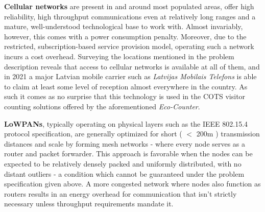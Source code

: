 \documentclass[10pt,nocopyrightspace]{ewsn-proc}
\begin{document}
\textbf{Cellular networks} are present in and around most populated areas, offer high reliability, high throughput communications even at relatively long ranges and a mature, well-understood technological base to work with. Almost invariably, however, this comes with a power consumption penalty. Moreover, due to the restricted, subscription-based service provision model, operating such a network incurs a cost overhead. Surveying the locations mentioned in the problem description reveals that access to cellular networks is available at all of them, and in 2021 a major Latvian mobile carrier such as \textit{Latvijas Mobilais Telefons} is able to claim at least  some level of reception almost everywhere in the country. As such it comes as no surprise that this technology is used in the COTS visitor counting solutions offered by the aforementioned \textit{Eco-Counter}.

\textbf{LoWPANs}, typically operating on physical layers such as the IEEE 802.15.4 protocol specification, are generally optimized for short ( $<$ 200m ) transmission distances and scale by forming mesh networks - where every node serves as a router and packet forwarder. This approach is favorable when the nodes can be expected to be relatively densely packed and uniformly distributed, with no distant outliers - a condition which cannot be guaranteed under the problem specification given above. A more congested network where nodes also function as routers results in an energy overhead for communication that isn’t strictly necessary unless throughput requirements mandate it.
\end{document}
